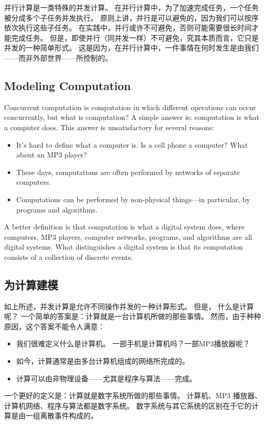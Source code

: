 \begin{ch}
并行计算是一类特殊的并发计算。
在并行计算中，为了加速完成任务，一个任务被分成多个子任务并发执行。
原则上讲，并行是可以避免的，因为我们可以按序依次执行这些子任务。
在实践中，并行或许不可避免，否则可能需要很长时间才能完成任务。
但是，即使并行（同并发一样）不可避免，究其本质而言，它只是并发的一种简单形式。
这是因为，在并行计算中，一件事情在何时发生是由我们——而非外部世界——所控制的。
\end{ch}

\begin{en}
\subsection{Modeling Computation} \label{sec:computing-devices}

Concurrent computation is computation in which different operations
can occur concurrently, but 
what is computation?  A simple answer is:
computation is what a computer does.  This answer is unsatisfactory
for several reasons:
\begin{itemize}
\item It's hard to define what a computer is.  Is a cell phone a
computer?  What about an MP3 player?

\item These days, computations are often performed by networks of
separate computers.

\item Computations can be performed by non-physical things---in particular,
by programs and algorithms.
\end{itemize}
A better definition is that computation is what a digital system does,
where computers, MP3 players, computer networks, programs, and
algorithms are all digital systems.  What distinguishes a digital
system is that its computation consists of a collection of discrete
events.  
\end{en}

\begin{ch}
\subsection{为计算建模} \label{sec:computing-devices}

如上所述，并发计算是允许不同操作并发的一种计算形式。
但是，
%
什么是计算呢？
一个简单的答案是：计算就是一台计算机所做的那些事情。
然而，由于种种原因，这个答案不能令人满意：
\begin{itemize}
  \item 我们很难定义什么是计算机。
    一部手机是计算机吗？一部MP3播放器呢？
  \item 如今，计算通常是由多台计算机组成的网络所完成的。
  \item 计算可以由非物理设备——尤其是程序与算法——完成。
\end{itemize}
一个更好的定义是：计算就是数字系统所做的那些事情。
计算机、MP3 播放器、计算机网络、程序与算法都是数字系统。
数字系统与其它系统的区别在于它的计算是由一组离散事件构成的。
\end{ch}

